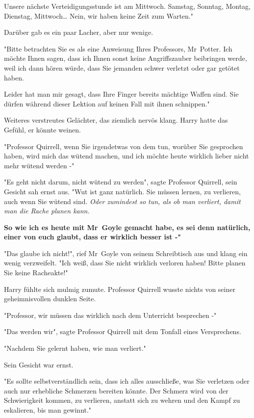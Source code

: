 {Unsere nächste Verteidigungsstunde ist am Mittwoch. Samstag, Sonntag, Montag, Dienstag, Mittwoch… Nein, wir haben keine Zeit zum Warten."

Darüber gab es ein paar Lacher, aber nur wenige.

"Bitte betrachten Sie es als eine Anweisung Ihres Professors, Mr~Potter. Ich möchte Ihnen sagen, dass ich Ihnen sonst keine Angriffszauber beibringen werde, weil ich dann hören würde, dass Sie jemanden schwer verletzt oder gar getötet haben.

Leider hat man mir gesagt, dass Ihre Finger bereits mächtige Waffen sind. Sie dürfen während dieser Lektion auf keinen Fall mit ihnen schnippen."

Weiteres verstreutes Gelächter, das ziemlich nervös klang. Harry hatte das Gefühl, er könnte weinen.

"Professor Quirrell, wenn Sie irgendetwas von dem tun, worüber Sie gesprochen haben, wird mich das wütend machen, und ich möchte heute wirklich lieber nicht mehr wütend werden -"

"Es geht nicht darum, nicht wütend zu werden", sagte Professor Quirrell, sein Gesicht sah ernst aus. "Wut ist ganz natürlich. Sie müssen lernen, zu verlieren, auch wenn Sie wütend sind. \emph{Oder zumindest so tun, als ob man verliert, damit man die Rache planen kann.}

\textbf{So wie ich es heute mit Mr~Goyle gemacht habe, es sei denn natürlich, einer von euch glaubt, dass er wirklich besser ist -"}

"Das glaube ich nicht!", rief Mr~Goyle von seinem Schreibtisch aus und klang ein wenig verzweifelt. "Ich weiß, dass Sie nicht wirklich verloren haben! Bitte planen Sie keine Racheakte!"

Harry fühlte sich mulmig zumute. Professor Quirrell wusste nichts von seiner geheimnisvollen dunklen Seite.

"Professor, wir müssen das wirklich nach dem Unterricht besprechen -"

"Das werden wir", sagte Professor Quirrell mit dem Tonfall eines Versprechens.

"Nachdem Sie gelernt haben, wie man verliert."

Sein Gesicht war ernst.

"Es sollte selbstverständlich sein, dass ich alles ausschließe, was Sie verletzen oder auch nur erhebliche Schmerzen bereiten könnte. Der Schmerz wird von der Schwierigkeit kommen, zu verlieren, anstatt sich zu wehren und den Kampf zu eskalieren, bis man gewinnt."

}
